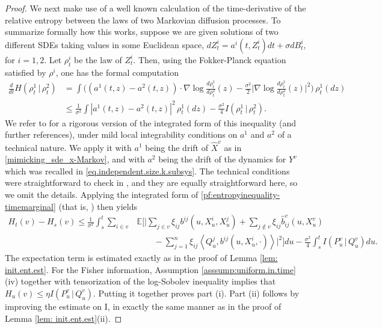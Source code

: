 \documentclass[11pt,reqno]{amsart}
\numberwithin{equation}{section}
\theoremstyle{definition}
\def\E{{\mathbb E}}
\begin{document}
\begin{proof}
		
We next make use of a well known calculation of the time-derivative of the relative entropy between the laws of two Markovian diffusion processes. To summarize formally how this works, suppose we are given solutions  of two different SDEs taking values in some Euclidean space, $dZ^i_t=a^i(t,Z^i_t)dt + \sigma dB^i_t$, for $i=1,2$. Let $\rho^i_t$ be the law of $Z^i_t$. Then, using the Fokker-Planck equation satisfied by $\rho^i$, one has the formal computation
\begin{align}
\frac{d}{dt}H(\rho^1_t\,|\,\rho^2_t) &= \int   \bigg( (a^1(t,z)-a^2(t,z)) \cdot \nabla\log\frac{d\rho^1_t}{d\rho^2_t}(z) - \frac{\sigma^2}{2}\Big|\nabla\log\frac{d\rho^1_t}{d\rho^2_t}(z)\Big|^2\bigg)\,\rho^1_t(dz) \nonumber \\
	&\le \frac{1}{\sigma^2} \int  |a^1(t,z)-a^2(t,z)|^2\,\rho^1_t(dz) - \frac{\sigma^2}{4}I(\rho^1_t\,|\,\rho^2_t). \label{pf:entropyinequality-timemarginal}
\end{align}
We refer to \cite[Lemma 3.1]{lacker2023sharp} for a rigorous version of the integrated form of this inequality (and further references), under mild local integrability conditions on $a^1$ and $a^2$ of a technical nature. We apply it with $a^1$ being the drift of $\widehat{X}^v$ as in \eqref{mimicking_sde_x-Markov}, and with $a^2$ being the drift of the dynamics for $Y^v$ which was recalled in \eqref{eq.independent.size.k.subsys}. The technical conditions were straightforward to check in \cite[Section 3.3]{lacker2023sharp}, and they are equally straightforward here, so we omit the details.
Applying the integrated form of \eqref{pf:entropyinequality-timemarginal} (that is, \cite[Lemma 3.1]{lacker2023sharp}) then yields
		\begin{align*}
			H_t(v) - H_s(v)  \le   \frac{1}{\sigma^2} \int_s^t  \sum_{i \in v} &\E \Biggl[ \Bigg| 
			\sum_{ j \in v}\xi_{ij} b^{ij}(u, X^i_u, X^j_u) + \sum_{j \notin v} \xi_{ij} \widehat{b}^v_{ij} (u, X^v_u) \\
			& \qquad  - \sum_{j=1}^n \xi_{ij}\left\langle Q^{j}_u, b^{ij}(u, X^i_u, \cdot)\right\rangle  \Bigg|^2\Biggr]  du -\frac{\sigma^2}{4} \int_s^t I(P^v_u \, | \, Q^v_u) du .
		\end{align*}
		The expectation term is estimated exactly as in the proof of Lemma \ref{lem: init.ent.est}. For the Fisher information,   Assumption \ref{asssump:uniform.in.time}(iv) together with tensorization of the log-Sobolev inequality \cite[Proposition 5.2.7]{bakry2014analysis} implies that $ H_u(v) \le \eta I(P^v_u \, | \, Q^v_u)$. Putting it together proves part (i). Part (ii) follows by improving the estimate on I, in exactly the same manner as in the proof of Lemma \ref{lem: init.ent.est}(ii).
	\end{proof}
	
\end{document}
